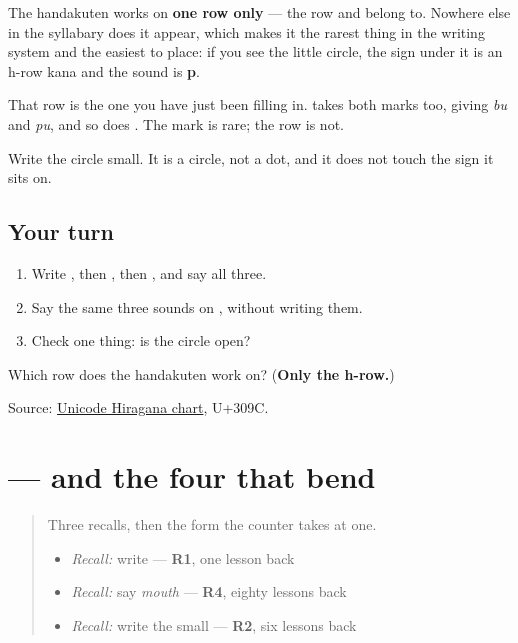 The handakuten works on \textbf{one row only} — the row \textbf{} and \textbf{} belong to. Nowhere else in the syllabary does it appear, which makes it the rarest thing in the writing system and the easiest to place: if you see the little circle, the sign under it is an h-row kana and the sound is \textbf{p}.

That row is the one you have just been filling in. \textbf{} takes both marks too, giving \emph{bu} and \emph{pu}, and so does \textbf{}. The mark is rare; the row is not.

Write the circle small. It is a circle, not a dot, and it does not touch the sign it sits on.

\subsection*{Your turn}
\begin{enumerate}
\raggedright
  \item Write \textbf{}, then \textbf{}, then \textbf{}, and say all three.
  \item Say the same three sounds on \textbf{}, without writing them.
  \item Check one thing: is the circle open?
\end{enumerate}

\begin{tcolorbox}[breakable,colback=teal!4,colframe=teal!35!black,title={Before you move on}]
Which row does the handakuten work on? (\textbf{Only the h-row.})

Source: \href{https://www.unicode.org/charts/PDF/U3040.pdf}{Unicode Hiragana chart}, U+309C.
\end{tcolorbox}
\section[\texorpdfstring{\ja{いっぽん} (ippon)}{いっぽん (ippon)}]{ — and the four that bend}

\label{lesson:JA-C18-ippon}



\begin{quote}
Three recalls, then the form the counter takes at one.

\begin{itemize}
\raggedright
  \item \emph{Recall:} write \textbf{} — \textbf{R1}, one lesson back
  \item \emph{Recall:} say \emph{mouth} — \textbf{R4}, eighty lessons back
  \item \emph{Recall:} write the small \textbf{} — \textbf{R2}, six lessons back
\end{itemize}
\end{quote}

